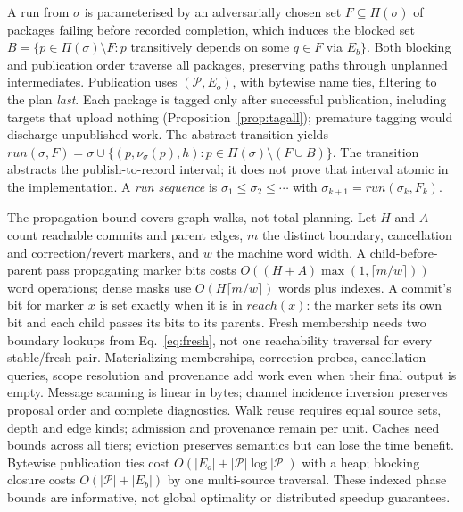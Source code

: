 \begin{definition}[run]
\label{def:run}
A run from $\sigma$ is parameterised by an adversarially chosen set
$F \subseteq \Pi(\sigma)$ of packages failing before recorded completion, which induces the
blocked set
$B = \{p \in \Pi(\sigma) \setminus F : p$ transitively depends on some
$q \in F$ via $E_b\}$. Both blocking and publication order traverse all
packages, preserving paths through unplanned intermediates. Publication uses
$(\mathcal P,E_o)$, with bytewise name ties, filtering to the plan \emph{last}.
Each package is tagged only after successful publication, including targets
that upload nothing (Proposition~\ref{prop:tagall}); premature tagging would
discharge unpublished work. The abstract transition yields
$\mathit{run}(\sigma,F) = \sigma \cup \{(p, \nu_\sigma(p), h) : p \in
\Pi(\sigma) \setminus (F \cup B)\}$. The transition abstracts the publish-to-record interval; it does not
prove that interval atomic in the implementation. A \emph{run sequence} is
$\sigma_1 \leq \sigma_2 \leq \cdots$ with $\sigma_{k+1} =
\mathit{run}(\sigma_k, F_k)$.
\end{definition}

The propagation bound covers graph walks, not total planning. Let $H$ and $A$
count reachable commits and parent edges, $m$ the distinct boundary, cancellation
and correction/revert markers, and $w$ the machine word width. A child-before-parent
pass propagating marker bits costs $O((H+A)\max(1,\lceil m/w\rceil))$ word
operations; dense masks use $O(H\lceil m/w\rceil)$ words plus indexes.
A commit's bit for marker $x$ is set exactly when it is in $\mathit{reach}(x)$:
the marker sets its own bit and each child passes its bits to its parents.
Fresh membership needs two boundary lookups from Eq.~\ref{eq:fresh}, not one
reachability traversal for every stable/fresh pair. Materializing memberships,
correction probes, cancellation queries, scope resolution and provenance add
work even when their final output is empty. Message scanning is linear in bytes;
channel incidence inversion preserves proposal order and complete diagnostics.
Walk reuse requires equal source sets, depth and edge kinds; admission and
provenance remain per unit. Caches need bounds across all tiers; eviction preserves semantics but
can lose the time benefit. Bytewise publication ties cost
$O(|E_o|+|\mathcal P|\log|\mathcal P|)$ with a heap; blocking closure costs
$O(|\mathcal P|+|E_b|)$ by one multi-source traversal. These indexed phase bounds
are informative, not global optimality or distributed speedup guarantees.

